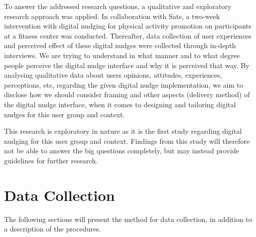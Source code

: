 
To answer the addressed research questions, a qualitative and exploratory research approach was applied. In collaboration with Sats, a two-week intervention with digital nudging for physical activity promotion on participants at a fitness center was conducted. Thereafter, data collection of user experiences and perceived effect of these digital nudges were collected through in-depth interviews. We are trying to understand in what manner and to what degree people perceive the digital nudge interface and why it is perceived that way. By analysing qualitative data about users opinions, attitudes, experiences, perceptions, etc, regarding the given digital nudge implementation, we aim to disclose how we should consider framing and other aspects (delivery method) of the digital nudge interface, when it comes to designing and tailoring digital nudges for this user group and context. 


This research is exploratory in nature as it is the first study regarding digital nudging for this user group and context. Findings from this study will therefore not be able to answer the big questions completely, but may instead provide guidelines for further research. 


\section{Data Collection}
The following sections will present the method for data collection, in addition to a description of the procedures. 

